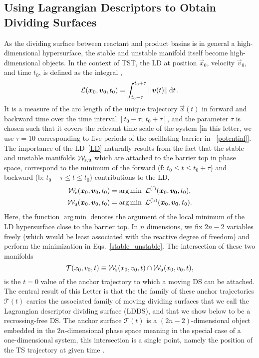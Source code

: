 \documentclass{elsarticle}
\def\EDITS#1{{\color{green}#1}}
\def\EDITS#1{#1}
\def\EDITS#1{{\color{mygreen}#1}}
\DeclareMathOperator*{\argmin}{arg\,min}
\begin{document}
\subsection{Using Lagrangian Descriptors to Obtain Dividing Surfaces}
As the dividing surface between reactant and product basins is in general a high-dimensional hypersurface, the stable and unstable manifold itself become high-dimensional objects.
In the context of TST, 
the \ac{LD} at position $\vec x_0$, velocity $\vec 
v_0$, and time $t_0$, 
is defined as the integral \cite{hern15e,hern16a,hern16i},
% 
\begin{equation}
\mathcal{L}(\boldsymbol{x}_0, \boldsymbol{v}_0, t_0) = \int_{t_0 - \tau}^{t_0 + \tau} 
||\boldsymbol{v}(t)||\,\mathrm{d}t \,.
\label{LD}
\end{equation}
% 
It is a measure of the arc length of the unique trajectory $\vec{x}(t)$ in 
forward and backward time over the time interval $[t_0-\tau;~t_0+\tau]$, and
the parameter $\tau$ is chosen such that it covers the relevant time 
scale of the system 
[in this \EDITS{letter}, we use $\tau=10$ corresponding to five periods of the 
oscillating barrier in \EQ~\eqref{potential}].
% 
The importance of the LD~\eqref{LD} naturally results from the fact that the 
stable and unstable manifolds $\mathcal{W}_\mathrm{s,u}$ which are attached to the 
barrier top in phase space, correspond to the minimum of the forward (f: $t_0\le 
t\le t_0 + \tau$) and backward (b: $t_0-\tau \le t \le t_0$) contributions to 
the LD,
% 
\begin{subequations}
\begin{align}
\mathcal{W}\sno{s}(\vec{x}_0,\vec{v}_0, t_0) &= 
\argmin~\mathcal{L}^{(\no{f})}(\vec{x}_0, \vec{v_0}, 
t_0),
\label{stable}\\
\mathcal{W}\sno{u}(\vec{x}_0,\vec{v}_0, t_0) &= 
\argmin~\mathcal{L}^{(\no{b})}(\vec{x}_0, \vec{v_0}, 
t_0).
\label{unstable}
\end{align}%
\label{stable_unstable}%
\end{subequations}
% 
Here, the function $\argmin$ denotes the argument of the 
local minimum of the \ac{LD} hypersurface close to the barrier top. 
\EDITS{In $n$ dimensions, we fix $2n-2$ variables freely
(which would be least associated with the reactive degree of
freedom) 
and perform the minimization in Eqs.~\eqref{stable_unstable}.
The intersection of these two manifolds
\begin{equation}
  \mathcal{T}(x_0,v_0,t) \equiv 
  \mathcal{W}_\mathrm{s}(x_0,v_0,t) \cap
  \mathcal{W}_\mathrm{u}(x_0,v_0,t), 
  \label{eq:DS-def}
\end{equation}
\EDITS{is the $t=0$ value of the}
anchor trajectory to which a moving DS can be attached.
The central result of this Letter
is that the 
\EDITS{the family of these anchor trajectories $\mathcal{T}(t)$ 
carries the associated family of moving dividing surfaces}
that we call the Lagrangian descriptor dividing surface (LDDS), 
and that we show below to be a recrossing-free DS.
The anchor surface $\mathcal{T}(t)$}
is a $(2n-2)$-dimensional object embedded in the $2n$-dimensional 
phase space meaning in the special case of a one-dimensional system,
this intersection is a single 
point, namely the position of the TS trajectory at given 
time \cite{hern15e}.
% 
\end{document}
